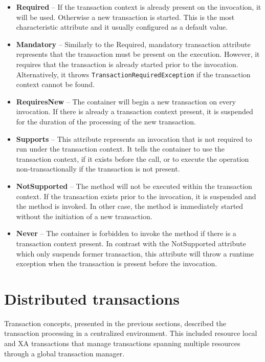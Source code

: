 \documentclass[oneside,
  digital, %
  table,   %
  lof,     %
  lot,     %
]{fithesis3}
\begin{document}
\begin{itemize}
    \item \textbf{Required} -- If the transaction context is already present on the invocation, it will be used. Otherwise a new transaction is started. This is the most characteristic attribute and it usually configured as a default value.
    
    \item \textbf{Mandatory} -- Similarly to the Required, mandatory transaction attribute represents that the transaction must be present on the execution. However, it requires that the transaction is already started prior to the invocation. Alternatively, it throws \texttt{TransactionRequiredException} if the transaction context cannot be found.
    
    \item \textbf{RequiresNew} -- The container will begin a new transaction on every invocation. If there is already a transaction context present, it is suspended for the duration of the processing of the new transaction. 
    
    \item \textbf{Supports} -- This attribute represents an invocation that is not required to run under the transaction context. It tells the container to use the transaction context, if it exists before the call, or to execute the operation non-transactionally if the transaction is not present.
    
    \item \textbf{NotSupported} -- The method will not be executed within the transaction context. If the transaction exists prior to the invocation, it is suspended and the method is invoked. In other case, the method is immediately started without the initiation of a new transaction.
    
    \item \textbf{Never} -- The container is forbidden to invoke the method if there is a transaction context present. In contrast with the NotSupported attribute which only suspends former transaction, this attribute will throw a runtime exception when the transaction is present before the invocation.
\end{itemize}

\section{Distributed transactions}

Transaction concepts, presented in the previous sections, described the transaction processing in a centralized environment. This included resource local and XA transactions that manage transactions spanning multiple resources through a global transaction manager.
\end{document}
